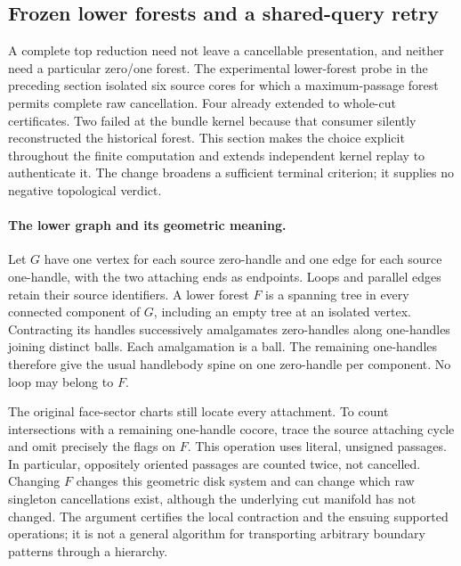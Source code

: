 \subsection{Frozen lower forests and a shared-query retry}
\label{marked-cut:lower-forests}

A complete top reduction need not leave a cancellable presentation, and
neither need a particular zero/one forest. The experimental lower-forest
probe in the preceding section isolated six source cores for which a
maximum-passage forest permits complete raw cancellation. Four already
extended to whole-cut certificates. Two failed at the bundle kernel because
that consumer silently reconstructed the historical forest. This section
makes the choice explicit throughout the finite computation and extends
independent kernel replay to authenticate it. The change broadens a
sufficient terminal criterion; it supplies no negative topological verdict.

\paragraph{The lower graph and its geometric meaning.}
Let $G$ have one vertex for each source zero-handle and one edge for each
source one-handle, with the two attaching ends as endpoints. Loops and
parallel edges retain their source identifiers. A lower forest $F$ is a
spanning tree in every connected component of $G$, including an empty tree
at an isolated vertex. Contracting its handles successively amalgamates
zero-handles along one-handles joining distinct balls. Each amalgamation
is a ball. The remaining one-handles therefore give the usual handlebody
spine on one zero-handle per component. No loop may belong to $F$.

The original face-sector charts still locate every attachment. To count
intersections with a remaining one-handle cocore, trace the source attaching
cycle and omit precisely the flags on $F$. This operation uses literal,
unsigned passages. In particular, oppositely oriented passages are counted
twice, not cancelled. Changing $F$ changes this geometric disk system and
can change which raw singleton cancellations exist, although the underlying
cut manifold has not changed. The argument certifies the local contraction
and the ensuing supported operations; it is not a general algorithm for
transporting arbitrary boundary patterns through a hierarchy.

